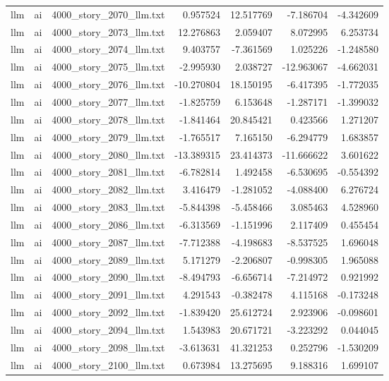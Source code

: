 \begin{longtable}{lllrrrr}
llm & ai & 4000\_story\_2070\_llm.txt & 0.957524 & 12.517769 & -7.186704 & -4.342609 \\
llm & ai & 4000\_story\_2073\_llm.txt & 12.276863 & 2.059407 & 8.072995 & 6.253734 \\
llm & ai & 4000\_story\_2074\_llm.txt & 9.403757 & -7.361569 & 1.025226 & -1.248580 \\
llm & ai & 4000\_story\_2075\_llm.txt & -2.995930 & 2.038727 & -12.963067 & -4.662031 \\
llm & ai & 4000\_story\_2076\_llm.txt & -10.270804 & 18.150195 & -6.417395 & -1.772035 \\
llm & ai & 4000\_story\_2077\_llm.txt & -1.825759 & 6.153648 & -1.287171 & -1.399032 \\
llm & ai & 4000\_story\_2078\_llm.txt & -1.841464 & 20.845421 & 0.423566 & 1.271207 \\
llm & ai & 4000\_story\_2079\_llm.txt & -1.765517 & 7.165150 & -6.294779 & 1.683857 \\
llm & ai & 4000\_story\_2080\_llm.txt & -13.389315 & 23.414373 & -11.666622 & 3.601622 \\
llm & ai & 4000\_story\_2081\_llm.txt & -6.782814 & 1.492458 & -6.530695 & -0.554392 \\
llm & ai & 4000\_story\_2082\_llm.txt & 3.416479 & -1.281052 & -4.088400 & 6.276724 \\
llm & ai & 4000\_story\_2083\_llm.txt & -5.844398 & -5.458466 & 3.085463 & 4.528960 \\
llm & ai & 4000\_story\_2086\_llm.txt & -6.313569 & -1.151996 & 2.117409 & 0.455454 \\
llm & ai & 4000\_story\_2087\_llm.txt & -7.712388 & -4.198683 & -8.537525 & 1.696048 \\
llm & ai & 4000\_story\_2089\_llm.txt & 5.171279 & -2.206807 & -0.998305 & 1.965088 \\
llm & ai & 4000\_story\_2090\_llm.txt & -8.494793 & -6.656714 & -7.214972 & 0.921992 \\
llm & ai & 4000\_story\_2091\_llm.txt & 4.291543 & -0.382478 & 4.115168 & -0.173248 \\
llm & ai & 4000\_story\_2092\_llm.txt & -1.839420 & 25.612724 & 2.923906 & -0.098601 \\
llm & ai & 4000\_story\_2094\_llm.txt & 1.543983 & 20.671721 & -3.223292 & 0.044045 \\
llm & ai & 4000\_story\_2098\_llm.txt & -3.613631 & 41.321253 & 0.252796 & -1.530209 \\
llm & ai & 4000\_story\_2100\_llm.txt & 0.673984 & 13.275695 & 9.188316 & 1.699107 \\

\end{longtable}
